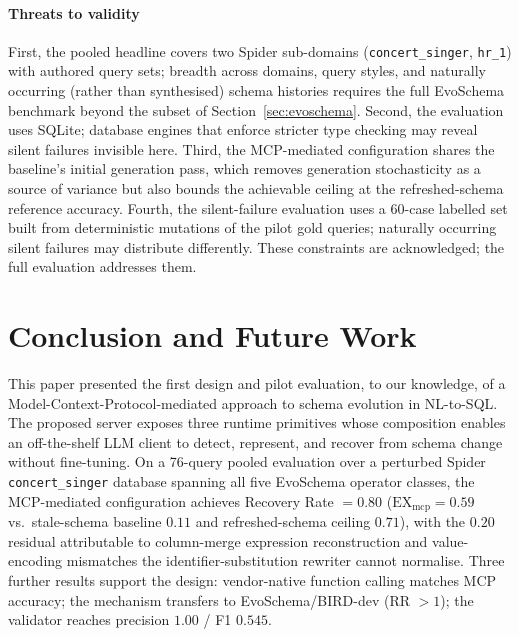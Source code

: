 \documentclass[conference,10pt,a4paper]{IEEEtran}
\begin{document}
\paragraph*{Threats to validity}
First, the pooled headline covers two Spider sub-domains
(\texttt{concert\_singer}, \texttt{hr\_1}) with authored query sets;
breadth across domains, query styles, and naturally occurring (rather
than synthesised) schema histories requires the full EvoSchema
benchmark beyond the subset of Section~\ref{sec:evoschema}.
Second, the evaluation uses SQLite; database engines
that enforce stricter type checking may reveal silent failures invisible
here. Third, the MCP-mediated configuration shares the baseline's
initial generation pass, which removes generation stochasticity as a
source of variance but also bounds the achievable ceiling at the
refreshed-schema reference accuracy.
Fourth, the silent-failure evaluation uses a 60-case labelled set
built from deterministic mutations of the pilot gold queries;
naturally occurring silent failures may distribute differently.
These constraints are acknowledged; the full evaluation addresses
them.

\section{Conclusion and Future Work}

This paper presented the first design and pilot evaluation, to our
knowledge, of a Model-Context-Protocol-mediated approach to schema
evolution in NL-to-SQL. The proposed server exposes three runtime
primitives whose composition enables an off-the-shelf LLM client to detect,
represent, and recover from schema change without fine-tuning. On a
76-query pooled evaluation over a perturbed Spider
\texttt{concert\_singer} database spanning all five EvoSchema operator
classes, the MCP-mediated configuration achieves Recovery Rate $= 0.80$
($\text{EX}_{\text{mcp}} = 0.59$ vs.\ stale-schema baseline $0.11$ and
refreshed-schema ceiling $0.71$), with the $0.20$ residual
attributable to column-merge expression reconstruction and
value-encoding mismatches the identifier-substitution rewriter cannot
normalise.
Three further results support the design: vendor-native function
calling matches MCP accuracy; the mechanism transfers to
EvoSchema/BIRD-dev (RR $> 1$); the validator reaches precision $1.00$
/ F1 $0.545$.
\end{document}
